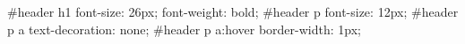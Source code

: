 #header h1 {
  font-size: 26px;
  font-weight: bold;
}
#header p {font-size: 12px;}
#header p a {text-decoration: none;}
#header p a:hover {border-width: 1px;}